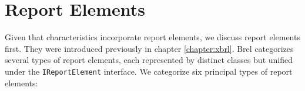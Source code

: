 \section{Report Elements}
\label{sec:api_report_elements}






Given that characteristics incorporate report elements, 
we discuss report elements first.
They were introduced previously in chapter \ref{chapter:xbrl}.
Brel categorizes several types of report elements, each represented by distinct classes but unified under the \texttt{IReportElement} interface.
We categorize six principal types of report elements:

